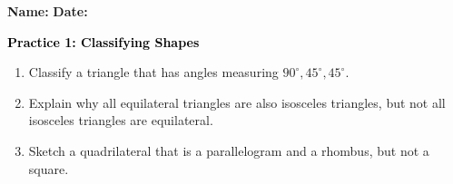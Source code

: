 \documentclass[12pt, letterpaper, fleqn]{article}
\begin{document}
\textbf{Name:} \underline{\hspace{5cm}}
\hfill
\textbf{Date:} \underline{\hspace{3cm}}\\

\begin{tcolorbox}[colback=customteal!20]
    \large\textcolor{black}{\textbf{Practice 1: Classifying Shapes}}
\end{tcolorbox}
\begin{enumerate}[itemsep=3.5cm, leftmargin=0.6cm]
\item Classify a triangle that has angles measuring $90^\circ, 45^\circ, 45^\circ$.
\vspace{3.5cm}
\item Explain why all equilateral triangles are also isosceles triangles, but not all isosceles triangles are equilateral.
\vspace{3.5cm}
\item Sketch a quadrilateral that is a parallelogram and a rhombus, but not a square.
\end{enumerate}
\end{document}
